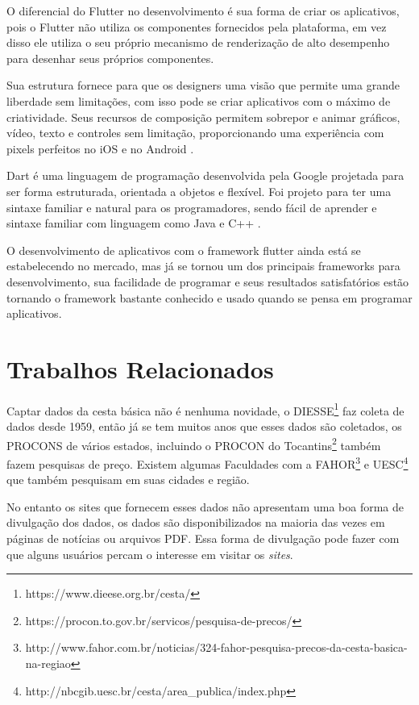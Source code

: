 \documentclass{ifto-tex}
\begin{document}
O diferencial do Flutter no desenvolvimento é sua forma de criar os aplicativos, pois o Flutter não utiliza os componentes fornecidos pela plataforma, em vez disso ele utiliza o seu próprio mecanismo de renderização de alto desempenho para desenhar seus próprios componentes. 

Sua estrutura fornece para que os designers uma visão que permite uma grande liberdade sem limitações, com isso pode se criar aplicativos com o máximo de criatividade. Seus recursos de composição permitem sobrepor e animar gráficos, vídeo, texto e controles sem limitação, proporcionando uma experiência com pixels perfeitos no iOS e no Android \cite{flutterf54:online}.

Dart é uma linguagem de programação desenvolvida pela Google projetada para ser forma estruturada, orientada a objetos e flexível. Foi projeto para ter uma sintaxe familiar e natural para os programadores, sendo fácil de aprender e sintaxe familiar com linguagem como Java e C++ \cite{DartNova22:online}.

O desenvolvimento de aplicativos com o framework flutter ainda está se estabelecendo no mercado, mas já se tornou um dos principais frameworks para desenvolvimento, sua facilidade de programar e seus resultados satisfatórios estão tornando o framework bastante conhecido e usado quando se pensa em programar aplicativos.


\section{Trabalhos Relacionados}
Captar dados da cesta básica não é nenhuma novidade, o DIESSE\footnote{https://www.dieese.org.br/cesta/} faz coleta de dados desde 1959, então já se tem muitos anos que esses dados são coletados, os PROCONS de vários estados, incluindo o PROCON do Tocantins\footnote{https://procon.to.gov.br/servicos/pesquisa-de-precos/} também fazem pesquisas de preço. Existem algumas Faculdades com a FAHOR\footnote{http://www.fahor.com.br/noticias/324-fahor-pesquisa-precos-da-cesta-basica-na-regiao} e UESC\footnote{http://nbcgib.uesc.br/cesta/area\_publica/index.php} que também pesquisam em suas cidades e região.

No entanto os sites que fornecem esses dados não apresentam uma boa forma de divulgação dos dados, os dados são disponibilizados na maioria das vezes em páginas de notícias  ou arquivos PDF. Essa forma de divulgação pode fazer com que alguns usuários percam o interesse em visitar os \textit{sites}.
\end{document}
